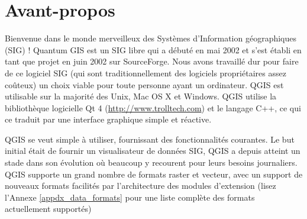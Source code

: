 \section{Avant-propos}\label{label_forward}
\setcounter{page}{1}



Bienvenue dans le monde merveilleux des Systèmes d'Information géographiques (SIG) ! Quantum GIS est un SIG libre qui a débuté en mai 2002 et s'est établi en tant que projet en juin 2002 sur SourceForge. Nous avons travaillé dur pour faire de ce logiciel SIG (qui sont traditionnellement des logiciels propriétaires assez coûteux) un choix viable pour toute personne ayant un ordinateur. QGIS est utilisable sur la majorité des Unix, Mac OS X et Windows. QGIS utilise la bibliothèque logicielle Qt 4 (\url{http://www.trolltech.com}) et le langage C++, ce qui ce traduit par une interface graphique simple et réactive.


QGIS se veut simple à utiliser, fournissant des fonctionnalités courantes. Le but initial était de fournir un visualisateur de données SIG, QGIS a depuis atteint un stade dans son évolution où beaucoup y recourent pour leurs besoins journaliers. QGIS supporte un grand nombre de formats raster et vecteur, avec un support de nouveaux formats facilités par l'architecture des modules d'extension (lisez l'Annexe \ref{appdx_data_formats} pour une liste complète des formats actuellement supportés)

